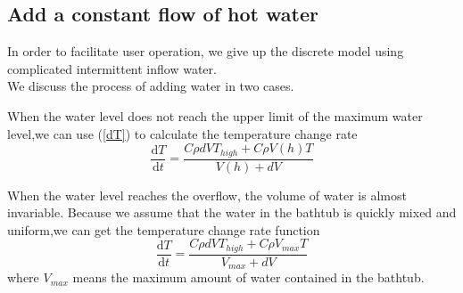 \documentclass{mcmthesis}
\begin{document}
\subsection{Add a constant flow of hot water}
In order to facilitate user operation, we give up the discrete model using complicated intermittent inflow water.\\
\indent We discuss the process of adding water in two cases.
\begin{itemize}
\item{
When the water level does not reach the upper limit of the maximum water level,we can use (\ref{dT}) to calculate the temperature change rate
\begin{equation}
	\frac{\mathrm{d} T}{\mathrm{d} t}=\frac{C\rho dVT_{high}+C\rho V(h)T}{V(h)+dV}
\label{dT}
\end{equation}
\item{
	When the water level reaches the overflow, the volume of water is almost invariable. Because we assume that the water in the bathtub is quickly mixed and uniform,we can get the temperature change rate function
	\begin{equation}
	\frac{\mathrm{d} T}{\mathrm{d} t}=\frac{C\rho dVT_{high}+C\rho V_{max}T}{V_{max}+dV}
	\label{dT}
	\end{equation}
	where $V_{max}$ means the maximum amount of water contained in the bathtub.
}
}
\end{itemize}
\end{document}
